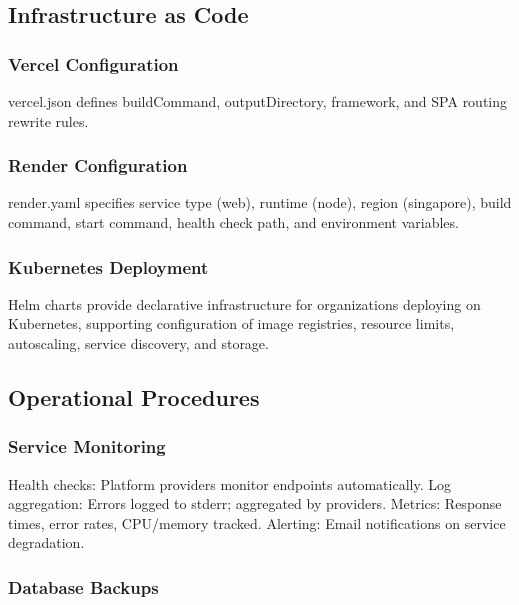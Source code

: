 \documentclass[12pt,oneside,openright,a4paper]{cpe-english-project}
\begin{document}
\vspace{1em}

\subsection{Infrastructure as Code}

\subsubsection{Vercel Configuration}

vercel.json defines buildCommand, outputDirectory, framework, and SPA routing rewrite rules.

\subsubsection{Render Configuration}

render.yaml specifies service type (web), runtime (node), region (singapore), build command, start command, health check path, and environment variables.

\subsubsection{Kubernetes Deployment}

Helm charts provide declarative infrastructure for organizations deploying on Kubernetes, supporting configuration of image registries, resource limits, autoscaling, service discovery, and storage.

\vspace{1em}

\subsection{Operational Procedures}

\subsubsection{Service Monitoring}

Health checks: Platform providers monitor endpoints automatically. Log aggregation: Errors logged to stderr; aggregated by providers. Metrics: Response times, error rates, CPU/memory tracked. Alerting: Email notifications on service degradation.

\subsubsection{Database Backups}
\end{document}
